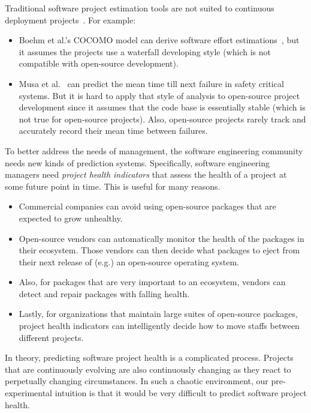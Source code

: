 \documentclass[sigconf,anonymous,review]{acmart}
\newcommand{\bi}{\begin{itemize}}
\newcommand{\ei}{\end{itemize}}
\begin{document}
Traditional software project estimation tools are not suited to continuous deployment projects~\cite{alexander2002working,llanos2012differences,shin2013can}. 
For example:
\bi
\item
Boehm et al.'s COCOMO model can derive    software effort estimations~\cite{boehm2000cost}, but it assumes the projects use a waterfall developing style
(which is not compatible with open-source development). 
\item
 Musa et al.~\cite{musa1993operational}
can  predict the mean time till next failure in safety critical systems. But it is hard to apply that  style of analysis   to  open-source project development since it assumes that the code base is essentially stable (which is not true for open-source projects).
Also,     open-source projects rarely track and  accurately record their mean time between failures.
\ei
To better address the needs of management, the software engineering community needs new kinds of prediction systems.
Specifically, software engineering
managers need {\em project health indicators} that  assess the health of a project
at some future point in time. This is useful for many reasons.
\bi
\item Commercial companies can avoid using open-source packages that are expected to grow unhealthy.
\item Open-source vendors can  automatically monitor the health of the packages in their ecosystem. Those vendors can then decide what packages to eject from their next release of (e.g.) an open-source operating system.
\item Also, for packages that are very important to an ecosystem,  vendors
can detect and repair  packages with falling health.
\item Lastly, for organizations that maintain large suites of open-source packages, project health indicators can intelligently decide how to move staffs between different projects.
\ei
In theory, predicting software project health is a complicated process. Projects that are continuously evolving are also continuously changing as they react to perpetually changing circumstances. In such  a chaotic environment, our pre-experimental intuition is that it would be very difficult to predict software project health.
\end{document}
